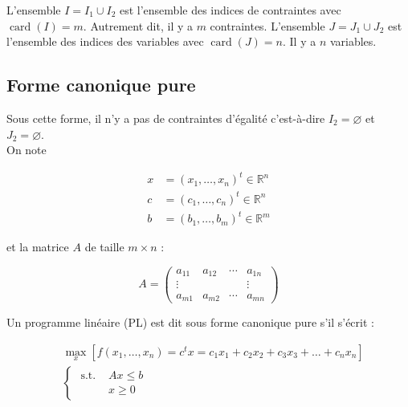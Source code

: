 \documentclass[a4paper,12pt,openany]{book}
\theoremstyle{plain}
\theoremstyle{definition}
\theoremstyle{remark}
\theoremstyle{nbstyle}
\begin{document}
	L'ensemble $I=I_{1} \cup I_{2}$ est l'ensemble des indices de contraintes avec $\operatorname{card}(I)=m$. Autrement dit, il y a $m$ contraintes. L'ensemble $J=J_{1} \cup J_{2}$ est l'ensemble des indices des variables avec $\operatorname{card}(J)=n$. Il y a $n$ variables.
	
	\subsection{Forme canonique pure}
	
	Sous cette forme, il n'y a pas de contraintes d'égalité c'est-à-dire $I_{2}=\varnothing$ et $J_{2}=\varnothing$.\\
	On note
	
	$$
	\begin{aligned}
	x & =(x_{1}, \ldots, x_{n})^{t} \in \mathbb{R}^{n} \\
	c & =(c_{1}, \ldots, c_{n})^{t} \in \mathbb{R}^{n} \\
	b & =(b_{1}, \ldots, b_{m})^{t} \in \mathbb{R}^{m}
	\end{aligned}
	$$
	
	et la matrice $A$ de taille $m \times n$ :
	
	$$
	A=\left(\begin{array}{cccc}
	a_{11} & a_{12} & \cdots & a_{1 n} \\
	\vdots & & & \vdots \\
	a_{m 1} & a_{m 2} & \cdots & a_{m n}
	\end{array}\right)
	$$
	
	Un programme linéaire (PL) est dit sous forme canonique pure s'il s'écrit :
	
	\begin{align*}
	& \displaystyle\max_{x}\left[f\left(x_{1}, \ldots, x_{n}\right)=c^{t} x=c_{1} x_{1}+c_{2} x_{2}+c_{3} x_{3}+\ldots +c_{n} x_{n}\right] \\
	& \left\{\begin{aligned}
	\text { s.t. } & A x \leq b \\
	& x \geq 0
	\end{aligned}\right. \tag{2.2}
	\end{align*}
	
\end{document}
